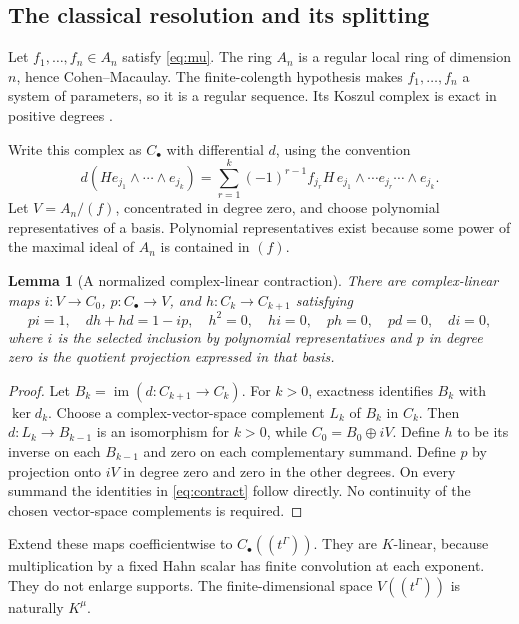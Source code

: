 \documentclass[11pt,letterpaper]{article}
\newtheorem{lemma}[lemma]{Lemma}
\theoremstyle{definition}
\theoremstyle{remark}
\newcommand{\im}{\operatorname{im}}
\numberwithin{equation}{section}
\begin{document}
\subsection{The classical resolution and its splitting}
Let $f_1,\ldots,f_n\in A_n$ satisfy \eqref{eq:mu}. The ring $A_n$ is a regular local ring of dimension $n$, hence Cohen--Macaulay. The finite-colength hypothesis makes $f_1,\ldots,f_n$ a system of parameters, so it is a regular sequence. Its Koszul complex is exact in positive degrees \cite{StacksRegular,StacksCM,StacksKoszul}.

Write this complex as $C_\bullet$ with differential $d$, using the convention
\begin{equation}\label{eq:koszul}
 d(H e_{j_1}\wedge\cdots\wedge e_{j_k})
 =\sum_{r=1}^k(-1)^{r-1}f_{j_r}H\,
 e_{j_1}\wedge\cdots\widehat{e_{j_r}}\cdots\wedge e_{j_k}.
\end{equation}
Let $V=A_n/(f)$, concentrated in degree zero, and choose polynomial representatives of a basis. Polynomial representatives exist because some power of the maximal ideal of $A_n$ is contained in $(f)$.

\begin{lemma}[A normalized complex-linear contraction]\label{lem:contraction}
There are complex-linear maps $i:V\to C_0$, $p:C_\bullet\to V$, and $h:C_k\to C_{k+1}$ satisfying
\begin{equation}\label{eq:contract}
 pi=1,\quad dh+hd=1-ip,\quad
 h^2=0,\quad hi=0,\quad ph=0,\quad pd=0,\quad di=0,
\end{equation}
where $i$ is the selected inclusion by polynomial representatives and $p$ in degree zero is the quotient projection expressed in that basis.
\end{lemma}
\begin{proof}
Let $B_k=\im(d:C_{k+1}\to C_k)$. For $k>0$, exactness identifies $B_k$ with $\ker d_k$. Choose a complex-vector-space complement $L_k$ of $B_k$ in $C_k$. Then $d:L_k\to B_{k-1}$ is an isomorphism for $k>0$, while $C_0=B_0\oplus iV$. Define $h$ to be its inverse on each $B_{k-1}$ and zero on each complementary summand. Define $p$ by projection onto $iV$ in degree zero and zero in the other degrees. On every summand the identities in \eqref{eq:contract} follow directly. No continuity of the chosen vector-space complements is required.
\end{proof}
Extend these maps coefficientwise to $C_\bullet((t^\Gamma))$. They are $K$-linear, because multiplication by a fixed Hahn scalar has finite convolution at each exponent. They do not enlarge supports. The finite-dimensional space $V((t^\Gamma))$ is naturally $K^\mu$.
\end{document}

